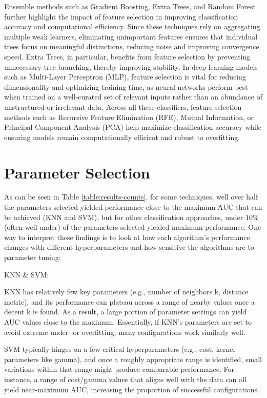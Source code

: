 \documentclass[letterpaper]{report}
\begin{document}
Ensemble methods such as Gradient Boosting, Extra Trees, and Random Forest further highlight the impact of feature selection in improving classification accuracy and computational efficiency. Since these techniques rely on aggregating multiple weak learners, eliminating unimportant features ensures that individual trees focus on meaningful distinctions, reducing noise and improving convergence speed. Extra Trees, in particular, benefits from feature selection by preventing unnecessary tree branching, thereby improving stability. In deep learning models such as Multi-Layer Perceptron (MLP), feature selection is vital for reducing dimensionality and optimizing training time, as neural networks perform best when trained on a well-curated set of relevant inputs rather than an abundance of unstructured or irrelevant data. Across all these classifiers, feature selection methods such as Recursive Feature Elimination (RFE), Mutual Information, or Principal Component Analysis (PCA) help maximize classification accuracy while ensuring models remain computationally efficient and robust to overfitting.

\section{Parameter Selection}
As can be seen in Table \ref{table:results-counts}, for some techniques, well over half the parameters selected yielded performance close to the maximum AUC that can be achieved (KNN and SVM), but for other classification approaches, under $10\%$ (often well under) of the parameters selected yielded maximum performance. One way to interpret these findings is to look at how each algorithm’s performance changes with different hyperparameters and how sensitive the algorithms are to parameter tuning:

KNN \& SVM:

KNN has relatively few key parameters (e.g., number of neighbors k, distance metric), and its performance can plateau across a range of nearby values once a decent k is found. As a result, a large portion of parameter settings can yield AUC values close to the maximum. Essentially, if KNN’s parameters are set to avoid extreme under- or overfitting, many configurations work similarly well.

SVM typically hinges on a few critical hyperparameters (e.g., cost, kernel parameters like gamma), and once a roughly appropriate range is identified, small variations within that range might produce comparable performance. For instance, a range of cost/gamma values that aligns well with the data can all yield near-maximum AUC, increasing the proportion of successful configurations.
\end{document}
